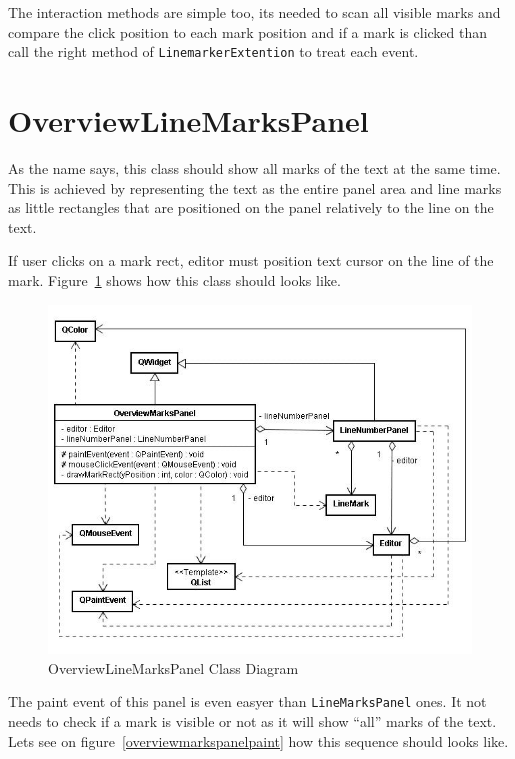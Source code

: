 \documentclass[11pt,a4paper]{report}
\begin{document}
The interaction methods are simple too, its needed to scan all visible marks and compare the click position to each mark position and if a mark is clicked than call the right method of \texttt{LinemarkerExtention} to treat each event.

\section{OverviewLineMarksPanel}
As the name says, this class should show all marks of the text at the same time. This is achieved by representing the text as the entire panel area and line marks as little rectangles that are positioned on the panel relatively to the line on the text.

If user clicks on a mark rect, editor must position text cursor on the line of the mark. Figure~\ref{overviewmarkspanel} shows how this class should looks like.

\begin{figure}[hbt]
\centering
\includegraphics{images/overviewmarkspanel.jpg}
\caption{OverviewLineMarksPanel Class Diagram} \label{overviewmarkspanel}
\end{figure}

The paint event of this panel is even easyer than \texttt{LineMarksPanel} ones. It not needs to check if a mark is visible or not as it will show ``all'' marks of the text. Lets see on figure~\ref{overviewmarkspanelpaint} how this sequence should looks like.
\end{document}
